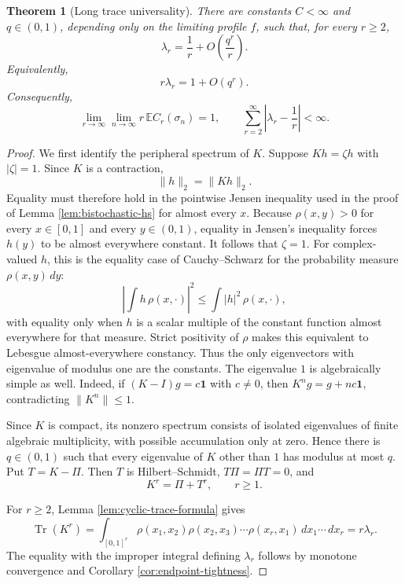\documentclass[11pt]{article}
\newtheorem{theorem}{Theorem}[section]
\theoremstyle{remark}
\newcommand{\Ee}{\mathbb E}
\newcommand{\one}{\mathbf 1}
\newcommand{\dd}{\,d}
\begin{document}
\begin{theorem}[Long trace universality]\label{thm:long-trace}
There are constants $C<\infty$ and $q\in(0,1)$, depending only on the limiting
profile $f$, such that, for every $r\ge2$,
\[
        \boxed{\displaystyle
        \lambda_r=\frac1r+O\!\left(\frac{q^r}{r}\right).}
\]
Equivalently,
\[
        r\lambda_r=1+O(q^r).
\]
Consequently,
\[
        \lim_{r\to\infty}\lim_{n\to\infty}
        r\,\Ee C_r(\sigma_n)=1,
        \qquad
        \sum_{r=2}^\infty\left|\lambda_r-\frac1r\right|<\infty.
\]
\end{theorem}

\begin{proof}
We first identify the peripheral spectrum of $K$.  Suppose $Kh=\zeta h$ with
$|\zeta|=1$.  Since $K$ is a contraction,
\[
        \|h\|_2=\|Kh\|_2.
\]
Equality must therefore hold in the pointwise Jensen inequality used in the
proof of Lemma \ref{lem:bistochastic-hs} for almost every $x$.  Because
$\rho(x,y)>0$ for every $x\in[0,1]$ and every $y\in(0,1)$, equality in Jensen's
inequality forces $h(y)$ to be almost everywhere constant.  It follows that
$\zeta=1$.
For complex-valued \(h\), this is the equality case of Cauchy--Schwarz for
the probability measure \(\rho(x,y)\dd y\):
\[
 \left|\int h\,\rho(x,\cdot)\right|^2
 \le \int |h|^2\,\rho(x,\cdot),
\]
with equality only when \(h\) is a scalar multiple of the constant function
almost everywhere for that measure.  Strict positivity of \(\rho\) makes
this equivalent to Lebesgue almost-everywhere constancy.
  Thus the only eigenvectors with eigenvalue of modulus one are the
constants.  The eigenvalue $1$ is algebraically simple as well.  Indeed, if
$(K-I)g=c\one$ with $c\ne0$, then $K^ng=g+nc\one$, contradicting
$\|K^n\|\le1$.

Since $K$ is compact, its nonzero spectrum consists of isolated eigenvalues of
finite algebraic multiplicity, with possible accumulation only at zero.  Hence
there is $q\in(0,1)$ such that every eigenvalue of $K$ other than $1$ has
modulus at most $q$.  Put $T=K-\Pi$.  Then $T$ is Hilbert--Schmidt,
$T\Pi=\Pi T=0$, and
\[
        K^r=\Pi+T^r,
        \qquad r\ge1.
\]

For $r\ge2$, Lemma \ref{lem:cyclic-trace-formula} gives
\[
        \operatorname{Tr}(K^r)
        =\int_{[0,1]^r}
        \rho(x_1,x_2)\rho(x_2,x_3)\cdots\rho(x_r,x_1)
        \dd x_1\cdots\dd x_r
        =r\lambda_r.
\]
The equality with the improper integral defining $\lambda_r$ follows by
monotone convergence and Corollary \ref{cor:endpoint-tightness}.


\end{proof}
\end{document}
